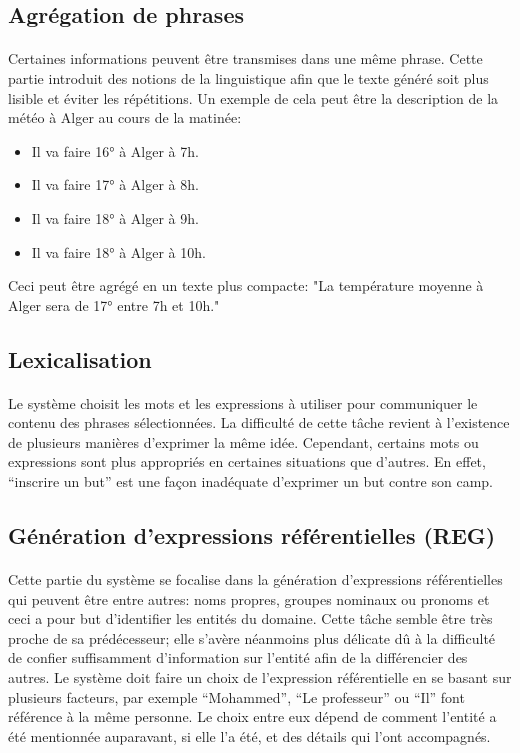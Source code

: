 	\subsection{Agrégation de phrases}
	\paragraph{}
	Certaines informations peuvent être transmises dans une même phrase. Cette partie introduit des notions de la linguistique afin que le texte généré soit plus lisible et éviter les répétitions. Un exemple de cela peut être la description de la météo à Alger au cours de la matinée:
	\begin{itemize}
		\item Il va faire 16° à Alger à 7h.
		\item Il va faire 17° à Alger à 8h.
		\item Il va faire 18° à Alger à 9h.
		\item Il va faire 18° à Alger à 10h.
	\end{itemize}
	Ceci peut être agrégé en un texte plus compacte: "La température moyenne à Alger sera de 17° entre 7h et 10h."
	
	\subsection{Lexicalisation}
	\paragraph{}Le système choisit les mots et les expressions à utiliser pour communiquer le contenu des phrases sélectionnées. La difficulté de cette tâche revient à l’existence de plusieurs manières d’exprimer la même idée. Cependant, certains mots ou expressions sont plus appropriés en certaines situations que d’autres. En effet, “inscrire un but” est une façon inadéquate d’exprimer un but contre son camp\cite{Gatt2018}.
	
	\subsection{Génération d’expressions référentielles (REG)}
	\paragraph{}Cette partie du système se focalise dans la génération d’expressions référentielles qui peuvent être entre autres: noms propres, groupes nominaux ou pronoms et ceci a pour but d’identifier les entités du domaine. Cette tâche semble être très proche de sa prédécesseur; elle s’avère néanmoins plus délicate dû à la difficulté de confier suffisamment d’information sur l’entité afin de la différencier des autres\cite{Reiter:1997}. Le système doit faire un choix de l’expression référentielle en se basant sur plusieurs facteurs, par exemple “Mohammed”, “Le professeur” ou “Il” font référence à la même personne. Le choix entre eux dépend de comment l’entité a été mentionnée auparavant, si elle l'a été, et des détails qui l'ont accompagnés. 
	
